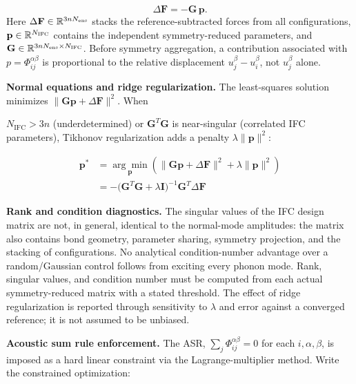 \documentclass[aps,prb,reprint,amsmath,amssymb,floatfix]{revtex4-2}
\begin{document}
\color{revisionblue}
\begin{equation*}
\Delta\mathbf F=-\mathbf G\,\mathbf p .
\end{equation*}
Here \(\Delta\mathbf F\in\mathbb R^{3nN_{\rm ens}}\) stacks the
reference-subtracted forces from all configurations,
\(\mathbf p\in\mathbb R^{N_{\rm IFC}}\) contains the independent
symmetry-reduced parameters, and
\(\mathbf G\in\mathbb R^{3nN_{\rm ens}\times N_{\rm IFC}}\). Before
symmetry aggregation, a contribution associated with
\(p=\Phi_{ij}^{\alpha\beta}\) is proportional to the relative displacement
\(u_j^\beta-u_i^\beta\), not \(u_j^\beta\) alone.
\color{black}

\color{revisionblue}
\textbf{Normal equations and ridge regularization.} The least-squares solution
minimizes \(\|\mathbf G\mathbf p+\Delta\mathbf F\|^2\). When
\color{black}

\color{revisionblue}
\(N_\text{IFC} > 3n\) (underdetermined) or \(\mathbf{G}^T\mathbf{G}\) is
near-singular (correlated IFC parameters), Tikhonov regularization adds
a penalty \(\lambda\|\mathbf{p}\|^2\):
\color{black}

\color{revisionblue}
\begin{align*}
\mathbf{p}^*
  &= \underset{\mathbf{p}}{\arg\min}\left(\|\mathbf{G}\mathbf{p}
      +\Delta\mathbf{F}\|^2+\lambda\|\mathbf{p}\|^2\right) \\
  &= -\bigl(\mathbf{G}^T\mathbf{G}+\lambda\mathbf{I}\bigr)^{-1}
      \mathbf{G}^T\Delta\mathbf{F}
\end{align*}
\color{black}

\color{revisionblue}
\textbf{Rank and condition diagnostics.} The singular values of the IFC design
matrix are not, in general, identical to the normal-mode amplitudes: the matrix
also contains bond geometry, parameter sharing, symmetry projection, and the
stacking of configurations. No analytical condition-number advantage over a
random/Gaussian control follows from exciting every phonon mode. Rank,
singular values, and condition number must be computed from each actual
symmetry-reduced matrix with a stated threshold. The effect of ridge
regularization is reported through sensitivity to \(\lambda\) and error against
a converged reference; it is not assumed to be unbiased.
\color{black}

\textbf{Acoustic sum rule enforcement.} The ASR,
\(\sum_j\Phi_{ij}^{\alpha\beta} = 0\) for each \(i,\alpha,\beta\), is
imposed as a hard linear constraint via the Lagrange-multiplier method.
Write the constrained optimization:
\end{document}
